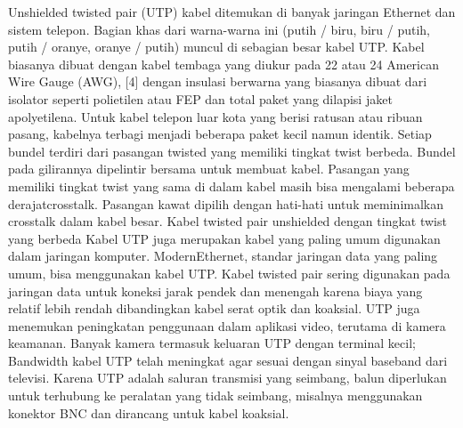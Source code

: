 Unshielded twisted pair (UTP) kabel ditemukan di banyak jaringan Ethernet dan sistem telepon. Bagian khas dari warna-warna ini (putih / biru, biru / putih, putih / oranye, oranye / putih) muncul di sebagian besar kabel UTP. Kabel biasanya dibuat dengan kabel tembaga yang diukur pada 22 atau 24 American Wire Gauge (AWG), [4] dengan insulasi berwarna yang biasanya dibuat dari isolator seperti polietilen atau FEP dan total paket yang dilapisi jaket apolyetilena. Untuk kabel telepon luar kota yang berisi ratusan atau ribuan pasang, kabelnya terbagi menjadi beberapa paket kecil namun identik. Setiap bundel terdiri dari pasangan twisted yang memiliki tingkat twist berbeda. Bundel pada gilirannya dipelintir bersama untuk membuat kabel. Pasangan yang memiliki tingkat twist yang sama di dalam kabel masih bisa mengalami beberapa derajatcrosstalk. Pasangan kawat dipilih dengan hati-hati untuk meminimalkan crosstalk dalam kabel besar. Kabel twisted pair unshielded dengan tingkat twist yang berbeda Kabel UTP juga merupakan kabel yang paling umum digunakan dalam jaringan komputer. ModernEthernet, standar jaringan data yang paling umum, bisa menggunakan kabel UTP. Kabel twisted pair sering digunakan pada jaringan data untuk koneksi jarak pendek dan menengah karena biaya yang relatif lebih rendah dibandingkan kabel serat optik dan koaksial. UTP juga menemukan peningkatan penggunaan dalam aplikasi video, terutama di kamera keamanan. Banyak kamera termasuk keluaran UTP dengan terminal kecil; Bandwidth kabel UTP telah meningkat agar sesuai dengan sinyal baseband dari televisi. Karena UTP adalah saluran transmisi yang seimbang, balun diperlukan untuk terhubung ke peralatan yang tidak seimbang, misalnya menggunakan konektor BNC dan dirancang untuk kabel koaksial.
